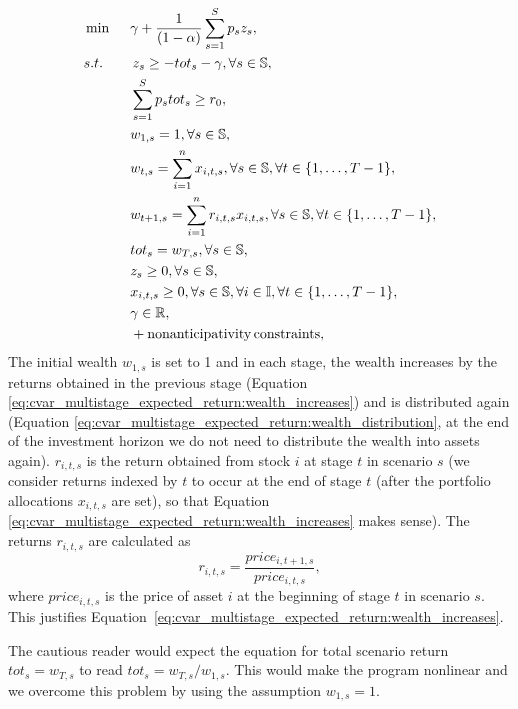 \begin{alignat}{10}
& \min \, \, \, && \gamma + \frac{1}{(1-\alpha)} \sum_{s=1}^S p_s z_s, \label{eq:cvar_multistage_expected_return}  \\
&s.t. && \, z_s \geq  -tot_s -\gamma, \forall s \in \mathbb{S}, \nonumber \\
&  && \sum_{s=1}^{S} p_s tot_s \geq r_0, \nonumber \\
& && w_{1,s}=1, \forall s \in \mathbb{S}, \nonumber \\
& && w_{t,s}=\sum_{i=1}^{n} x_{i,t,s}, \forall s \in \mathbb{S}, \forall t \in \{1,\dots,T-1\}, \label{eq:cvar_multistage_expected_return:wealth_distribution} \\
& && w_{t+1,s}=\sum_{i=1}^{n} r_{i,t,s} x_{i,t,s}, \forall s \in \mathbb{S}, \forall t \in \{1,\dots ,T-1\}, \label{eq:cvar_multistage_expected_return:wealth_increases} \\
& && tot_s = w_{T,s}, \forall s \in \mathbb{S}, \nonumber \\
& && z_s \geq 0, \forall s \in \mathbb{S}, \nonumber \\
& && x_{i,t,s} \geq 0, \forall s \in \mathbb{S}, \forall i \in \mathbb{I}, \forall t \in \{1,\dots ,T-1\}, \nonumber \\
& && \gamma \in \R ,\nonumber \\
& && + \mathrm{nonanticipativity \, constraints}, \nonumber
\end{alignat}
The initial wealth $w_{1,s}$ is set to 1 and in each stage, the wealth increases by the returns obtained in the previous stage (Equation \ref{eq:cvar_multistage_expected_return:wealth_increases}) and is distributed again (Equation \ref{eq:cvar_multistage_expected_return:wealth_distribution}, at the end of the investment horizon we do not need to distribute the wealth into assets again). $r_{i,t,s}$ is the return obtained from stock $i$ at stage $t$ in scenario $s$ (we consider returns indexed by $t$ to occur at the end of stage $t$ (after the portfolio allocations $x_{i,t,s}$ are set), so that Equation \ref{eq:cvar_multistage_expected_return:wealth_increases} makes sense). 
The returns $r_{i,t,s}$ are calculated as
\begin{equation*}
r_{i,t,s} = \frac{price_{i,t+1,s}}{price_{i,t,s}},
\end{equation*}
where $price_{i,t,s}$ is the price of asset $i$ at the beginning of stage $t$ in scenario $s$. This justifies Equation~\ref{eq:cvar_multistage_expected_return:wealth_increases}.

\begin{rem}
The cautious reader would expect the equation for total scenario return $tot_s = w_{T,s}$ to read $tot_s = w_{T,s}/w_{1,s}$. This would make the program nonlinear and we overcome this problem by using the assumption $w_{1,s}=1$.
\end{rem}



